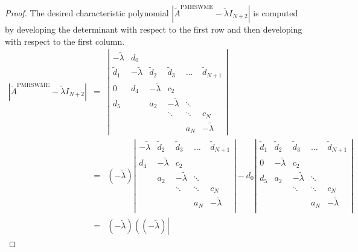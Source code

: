 \documentclass[a4paper, 11pt]{article}
\begin{document}
\begin{proof}
    The desired characteristic polynomial $\left| \widetilde{A}^{{\textrm{PMHSWME}}} - \widetilde{\lambda} I_{N+2} \right|$ is computed by developing the determinant with respect to the first row and then developing with respect to the first column.
    \begin{eqnarray*}
        \left| \widetilde{A}^{{\textrm{PMHSWME}}} - \widetilde{\lambda} I_{N+2} \right| &=& \left|
        \begin{array}{cccccc}
    - \widetilde{\lambda} & d_0 &  &  &  &  \\
    \widetilde{d}_{1} & - \widetilde{\lambda} & \widetilde{d}_{2} & \widetilde{d}_{3} & \dots & \widetilde{d}_{{N+1}} \\
    0 & d_4 & - \widetilde{\lambda} & c_2 & &\\
    d_5 &   & a_2 & - \widetilde{\lambda} & \ddots & \\
     &  &  & \ddots & \ddots & c_N \\
     &  &  &  & a_N & - \widetilde{\lambda}
    \end{array}
        \right| \\
      &=& (-\widetilde{\lambda})
      \left|
        \begin{array}{ccccc}
         -\widetilde{\lambda} & \widetilde{d}_{2} & \widetilde{d}_{3} & \dots & \widetilde{d}_{{N+1}} \\
          d_4 & -\widetilde{\lambda} & c_2  &  &   \\
           & a_2 & -\widetilde{\lambda} & \ddots  &   \\
        &  & \ddots & \ddots & c_N \\
         &  &  & a_N & -\widetilde{\lambda}   \\
        \end{array}
        \right|
        -d_0 \left|
        \begin{array}{ccccc}
        \widetilde{d}_{1} & \widetilde{d}_{2} & \widetilde{d}_{3} & \dots & \widetilde{d}_{{N+1}} \\
         0 &  -\widetilde{\lambda} & c_2  &  &   \\
         d_5 & a_2 & -\widetilde{\lambda} & \ddots  &   \\
        &   & \ddots & \ddots & c_N \\
         &   &  & a_N & -\widetilde{\lambda}   \\
        \end{array}
        \right| \\
        &=& (-\widetilde{\lambda}) \left( (-\widetilde{\lambda})  \left|

\end{eqnarray*}
\end{proof}
\end{document}
